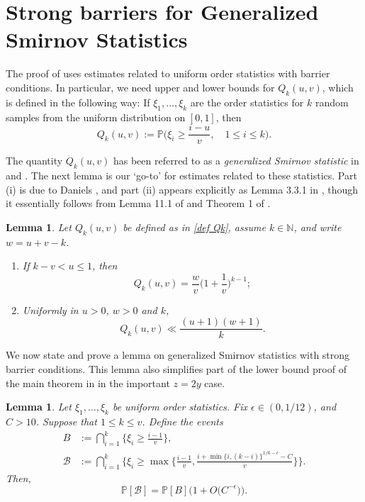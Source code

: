 \documentclass{amsart}
\newtheorem{lemma}[theorem]{Lemma}
\theoremstyle{definition}
\numberwithin{equation}{section}
\newcommand{\N}{\mathbb{N}}
\renewcommand{\P}{\mathbb{P}}
\begin{document}
\section{Strong barriers for Generalized Smirnov Statistics}
The proof of  uses estimates related to uniform order statistics with barrier conditions. In particular, we need upper and lower bounds for $Q_k(u,v)$, which is defined in the following way: If $\xi_1,\dots,\xi_k$ are the order statistics for $k$ random samples from the uniform distribution on $[0,1]$, then 
\begin{equation}\label{def Qk}
	Q_k(u,v) := \P\Big( \xi_i \geq \frac{i-u}{v}, \quad 1 \leq i \leq k \Big).
\end{equation}

The quantity $Q_k(u,v)$ has been referred to as a \textit{generalized Smirnov statistic} in \cite{ford2007generalized} and \cite{Ford2008}. The next lemma is our `go-to' for estimates related to these statistics. Part (i) is due to Daniels \cite{daniels1945statistical}, and part (ii) appears explicitly as Lemma 3.3.1 in \cite{koukoulopoulos2010generalized}, though it essentially follows from Lemma 11.1 of \cite{ford2008distribution} and Theorem 1 of \cite{Ford2008}.
\begin{lemma}\label{order stats lem} Let $Q_k(u,v)$ be defined as in \eqref{def Qk}, assume $k \in \N$, and write $w = u+v-k$.
	\begin{enumerate}[label = (\roman*)]
		\item If $k-v < u \leq 1$, then 
		$$Q_k(u,v) = \frac{w}{v}\bigg(1+\frac{1}{v}\bigg)^{k-1};$$
		\item Uniformly in $u > 0$, $w >0$ and $k$,
		$$Q_k(u,v) \ll \frac{(u+1)(w+1)}{k}.$$
	\end{enumerate}
\end{lemma}
 We now state and prove a lemma on generalized Smirnov statistics with strong barrier conditions. This lemma also simplifies part of the lower bound proof of the main theorem in \cite{ford2008distribution} in the important $z=2y$ case.
\begin{lemma}\label{lemma better smirnov}
	Let $\xi_1,\dots,\xi_k$ be uniform order statistics. Fix $\epsilon \in (0,1/12)$, and $C > 10$. Suppose that $1 \le k \leq v$. Define the events
	\begin{align*}
		B&:= \bigcap_{i = 1}^k\Big\{\xi_i \geq \frac{i-1}{v}\Big\},\\
		\mathscr{B} &:= \bigcap_{i = 1}^k\Bigg\{ \xi_i \geq \max\bigg\{\frac{i-1}{v},\frac{i+\min\{i , (k-i)\}^{1/6-\epsilon}-C}{v}\bigg\}\Bigg\}.
	\end{align*}
	Then,
	$$\P[\mathscr{B}] = \P[B]\big(1 + O\big(C^{-\epsilon}\big)\big).$$
\end{lemma}
\end{document}
